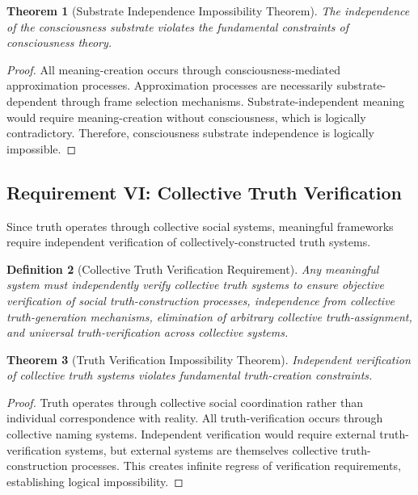 \documentclass[12pt,a4paper]{article}
\newtheorem{theorem}{Theorem}[section]
\newtheorem{definition}[theorem]{Definition}
\begin{document}
\begin{theorem}[Substrate Independence Impossibility Theorem]
The independence of the consciousness substrate violates the fundamental constraints of consciousness theory.
\end{theorem}

\begin{proof}
All meaning-creation occurs through consciousness-mediated approximation processes. Approximation processes are necessarily substrate-dependent through frame selection mechanisms. Substrate-independent meaning would require meaning-creation without consciousness, which is logically contradictory. Therefore, consciousness substrate independence is logically impossible.
\end{proof}

\subsection{Requirement VI: Collective Truth Verification}

Since truth operates through collective social systems, meaningful frameworks require independent verification of collectively-constructed truth systems.

\begin{definition}[Collective Truth Verification Requirement]
Any meaningful system must independently verify collective truth systems to ensure objective verification of social truth-construction processes, independence from collective truth-generation mechanisms, elimination of arbitrary collective truth-assignment, and universal truth-verification across collective systems.
\end{definition}

\begin{theorem}[Truth Verification Impossibility Theorem]
Independent verification of collective truth systems violates fundamental truth-creation constraints.
\end{theorem}

\begin{proof}
Truth operates through collective social coordination rather than individual correspondence with reality. All truth-verification occurs through collective naming systems. Independent verification would require external truth-verification systems, but external systems are themselves collective truth-construction processes. This creates infinite regress of verification requirements, establishing logical impossibility.
\end{proof}
\end{document}
